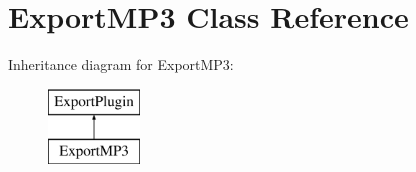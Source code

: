 \hypertarget{class_export_m_p3}{}\section{Export\+M\+P3 Class Reference}
\label{class_export_m_p3}
Inheritance diagram for Export\+M\+P3\+:\begin{figure}[H]
\begin{center}
\leavevmode
\includegraphics[height=2.000000cm]{class_export_m_p3}
\end{center}
\end{figure}
